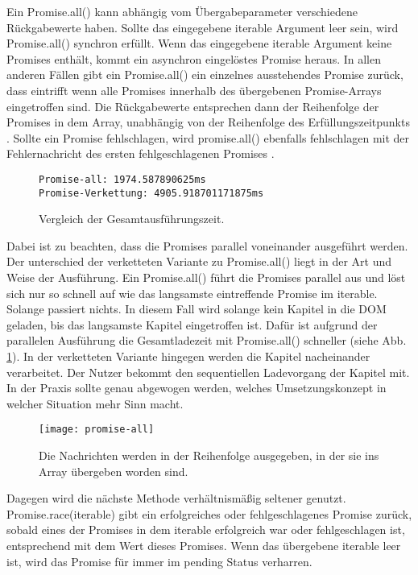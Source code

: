 \noindent
Ein Promise.all() kann abhängig vom Übergabeparameter verschiedene Rückgabewerte haben. Sollte das eingegebene iterable Argument leer sein, wird Promise.all() synchron erfüllt. Wenn das eingegebene iterable Argument keine Promises enthält, kommt ein asynchron eingelöstes Promise heraus. In allen anderen Fällen gibt ein Promise.all() ein einzelnes ausstehendes Promise zurück, dass eintrifft wenn alle Promises innerhalb des übergebenen Promise-Arrays eingetroffen sind. Die Rückgabewerte entsprechen dann der Reihenfolge der Promises in dem Array, unabhängig von der Reihenfolge des Erfüllungszeitpunkts \cite{promise-all}. Sollte ein Promise fehlschlagen, wird promise.all() ebenfalls fehlschlagen mit der Fehlernachricht des ersten fehlgeschlagenen Promises \cite{promise-executor}.\\

\begin{figure}[H]
\begin{lstlisting}
Promise-all: 1974.587890625ms
Promise-Verkettung: 4905.918701171875ms
\end{lstlisting}
\caption{Vergleich der Gesamtausführungszeit.}
\label{comparison-promise-all-and-chained-promise}
\end{figure}

\noindent
Dabei ist zu beachten, dass die Promises parallel voneinander ausgeführt werden. Der unterschied der verketteten Variante zu Promise.all() liegt in der Art und Weise der Ausführung. Ein Promise.all() führt die Promises parallel aus und löst sich nur so schnell auf wie das langsamste eintreffende Promise im iterable. Solange passiert nichts. In diesem Fall wird solange kein Kapitel in die DOM geladen, bis das langsamste Kapitel eingetroffen ist. Dafür ist aufgrund der parallelen Ausführung die Gesamtladezeit mit Promise.all() schneller (siehe Abb. \ref{comparison-promise-all-and-chained-promise}). In der verketteten Variante hingegen werden die Kapitel nacheinander verarbeitet. Der Nutzer bekommt den sequentiellen Ladevorgang der Kapitel mit. In der Praxis sollte genau abgewogen werden, welches Umsetzungskonzept in welcher Situation mehr Sinn macht.

\begin{figure}[H]
\centering
\texttt{[image: promise-all]}
\caption{Die Nachrichten werden in der Reihenfolge ausgegeben, in der sie ins Array übergeben worden sind.}
\end{figure}

\noindent
Dagegen wird die nächste Methode verhältnismäßig seltener genutzt. Promise.race(iterable) gibt ein erfolgreiches oder fehlgeschlagenes Promise zurück, sobald eines der Promises in dem iterable erfolgreich war oder fehlgeschlagen ist, entsprechend mit dem Wert dieses Promises. Wenn das übergebene iterable leer ist, wird das Promise für immer im pending Status verharren\cite{promise-race}.


